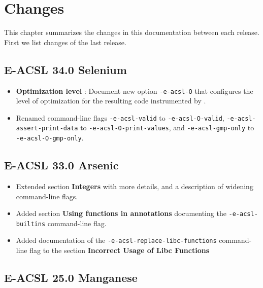 \chapter{Changes}\label{chap:changes}

This chapter summarizes the changes in this documentation between each \eacsl
release. First we list changes of the last release.



\section*{E-ACSL 34.0 Selenium}

\begin{itemize}
\item \textbf{Optimization level} : Document new option
\texttt{-e-acsl-O} that configures the level of optimization for the resulting
code instrumented by \eacsl.
\item Renamed command-line flags
  \texttt{-e-acsl-valid} to \texttt{-e-acsl-O-valid},
  \texttt{-e-acsl-assert-print-data} to \texttt{-e-acsl-O-print-values},
  and \texttt{-e-acsl-gmp-only} to \texttt{-e-acsl-O-gmp-only}.
\end{itemize}


\section*{E-ACSL 33.0 Arsenic}

\begin{itemize}
\item Extended section \textbf{Integers} with more details, and
  a description of widening command-line flags.
\item Added section \textbf{Using \C functions in annotations} documenting the
  \texttt{-e-acsl-builtins} command-line flag.
\item Added documentation of the \texttt{-e-acsl-replace-libc-functions}
  command-line flag to the section \textbf{Incorrect Usage of Libc Functions}

\end{itemize}

\section*{E-ACSL 25.0 Manganese}


